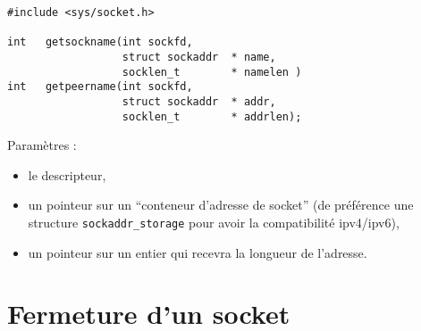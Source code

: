 \extrait
\begin{lstlisting}
#include <sys/socket.h>

int   getsockname(int sockfd,  
                  struct sockaddr  * name,
                  socklen_t        * namelen )
int   getpeername(int sockfd,
                  struct sockaddr  * addr,
                  socklen_t        * addrlen);
\end{lstlisting}

Paramètres :
\begin{itemize}

\item le descripteur,
  \item un pointeur sur un ``conteneur d'adresse
de socket'' (de préférence une structure \texttt{sockaddr\_storage}
pour avoir la compatibilité ipv4/ipv6),
\item
  un pointeur sur un entier
qui recevra la longueur de l'adresse.
\end{itemize}

 









\section{Fermeture d'un socket}


